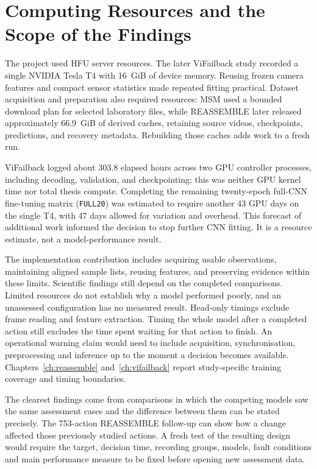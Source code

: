 
\section{Computing Resources and the Scope of the Findings}
\label{sec:ch4-boundaries}

The project used HFU server resources. The later ViFailback study recorded a single
NVIDIA Tesla T4 with 16~GiB of device memory. Reusing frozen camera features and compact
sensor statistics made repeated fitting practical. Dataset acquisition and preparation
also required resources: MSM used a bounded download plan for selected laboratory files,
while REASSEMBLE later released approximately 66.9~GiB of derived caches, retaining
source videos, checkpoints, predictions, and recovery metadata. Rebuilding those caches
adds work to a fresh run.

ViFailback logged about 303.8 elapsed hours across two GPU controller processes,
including decoding, validation, and checkpointing; this was neither GPU kernel time nor
total thesis compute. Completing the remaining twenty-epoch full-CNN fine-tuning matrix (\texttt{FULL20}) was estimated to
require another 43 GPU days on the single T4, with 47 days allowed for variation and
overhead. This forecast of additional work informed the decision to stop further CNN
fitting. It is a resource estimate, not a model-performance result.

The implementation contribution includes acquiring usable observations, maintaining
aligned sample lists, reusing features, and preserving evidence within these limits.
Scientific findings still depend on the completed comparisons. Limited resources do not
establish why a model performed poorly, and an unassessed configuration has no measured
result. Head-only timings exclude frame reading and feature extraction. Timing the
whole model after a completed action still excludes the time spent waiting for that
action to finish. An operational warning claim would need to include acquisition,
synchronisation, preprocessing and inference up to the moment a decision becomes
available. Chapters~\ref{ch:reassemble} and~\ref{ch:vifailback} report study-specific
training coverage and timing boundaries.

The clearest findings come from comparisons in which the competing models saw the
same assessment cases and the difference between them can be stated precisely.
The 753-action REASSEMBLE follow-up can show how a change affected those previously
studied actions. A fresh test of the resulting design would require the target,
decision time, recording groups, models, fault conditions and main performance
measure to be fixed before opening new assessment data.
